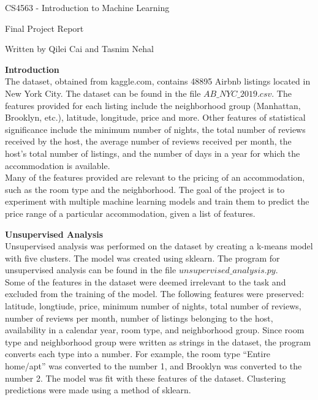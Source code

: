 \documentclass[12pt]{article}
\begin{document}
	\begin{center}
		CS4563 - Introduction to Machine Learning
	\end{center}

	\begin{center}
		Final Project Report
	\end{center}
	
	\begin{center} Written by Qilei Cai and Tasnim Nehal
	\end{center}
	
	\bigskip
	
	
	\textbf{Introduction}\\
	
	The dataset, obtained from kaggle.com, contains 48895 Airbnb listings located in New York City. The dataset can be found in the file $AB\_NYC\_2019.csv$. The features provided for each listing include the neighborhood group (Manhattan, Brooklyn, etc.), latitude, longitude, price and more. Other features of statistical significance include the minimum number of nights, the total number of reviews received by the host, the average number of reviews received per month, the host's total number of listings, and the number of days in a year for which the accommodation is available.\\
	
	Many of the features provided are relevant to the pricing of an accommodation, such as the room type and the neighborhood. The goal of the project is to experiment with multiple machine learning models and train them to predict the price range of a particular accommodation, given a list of features.
	
	\bigskip
	
	\textbf{Unsupervised Analysis}\\
	
	Unsupervised analysis was performed on the dataset by creating a k-means model with five clusters. The model was created using sklearn. The program for unsupervised analysis can be found in the file $unsupervised\_analysis.py$.\\
	
	Some of the features in the dataset were deemed irrelevant to the task and excluded from the training of the model. The following features were preserved: latitude, longtiude, price, minimum number of nights, total number of reviews, number of reviews per month, number of listings belonging to the host, availability in a calendar year, room type, and neighborhood group. Since room type and neighborhood group were written as strings in the dataset, the program converts each type into a number. For example, the room type ``Entire home/apt'' was converted to the number 1, and Brooklyn was converted to the number 2. The model was fit with these features of the dataset. Clustering predictions were made using a method of sklearn.\\
	
\end{document}
